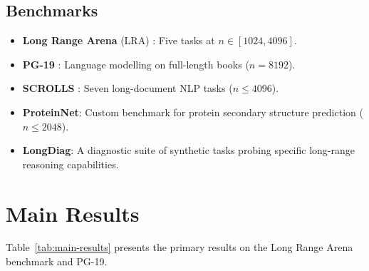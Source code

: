 \documentclass[12pt,a4paper,oneside]{book}
\begin{document}
\subsection{Benchmarks}

\begin{itemize}
  \item \textbf{Long Range Arena} (LRA) \cite{tay2021long}: Five tasks at
    $n \in [1024, 4096]$.
  \item \textbf{PG-19} \cite{rae2019compressive}: Language modelling on full-length
    books ($n = 8192$).
  \item \textbf{SCROLLS} \cite{shaham2022scrolls}: Seven long-document NLP tasks
    ($n \leq 4096$).
  \item \textbf{ProteinNet}: Custom benchmark for protein secondary structure prediction
    ($n \leq 2048$).
  \item \textbf{LongDiag}: A diagnostic suite of synthetic tasks probing specific
    long-range reasoning capabilities.
\end{itemize}

\section{Main Results}

Table~\ref{tab:main-results} presents the primary results on the Long Range Arena
benchmark and PG-19.
\end{document}
